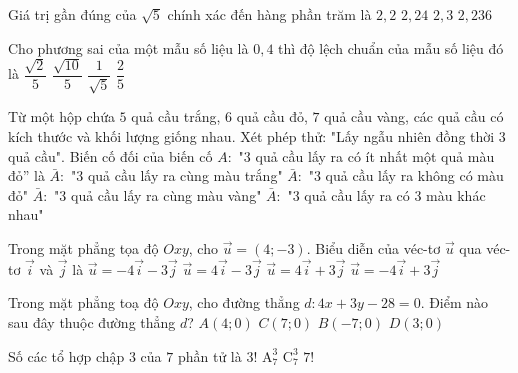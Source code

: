 \begin{ex}%
	Giá trị gần đúng của $\sqrt{5}$ chính xác đến hàng phần trăm là
	\choice
	{$2{,}2$ }
	{\True $2{,}24$}
	{$2{,}3$}
	{$2{,}236$}
\end{ex}
\begin{ex}%
	Cho phương sai của một mẫu số liệu là $0{,}4$ thì độ lệch chuẩn của mẫu số liệu đó là
	\choice
	{$\dfrac{\sqrt{2}}{5}$}
	{\True $\dfrac{\sqrt{10}}{5}$}
	{$\dfrac{1}{\sqrt{5}}$}
	{$\dfrac{2}{5}$}
\end{ex}
\begin{ex}%
	Từ một hộp chứa $5$ quả cầu trắng, $6$ quả cầu đỏ, $7$ quả cầu vàng, các quả cầu có kích thước và khối lượng giống nhau. Xét phép thử: "Lấy ngẫu nhiên đồng thời $3$ quả cầu". Biến cố đối của biến cố $A\colon$ "$3$ quả cầu lấy ra có ít nhất một quả màu đỏ” là
	\choice
	{$\bar{A}\colon$ "3 quả cầu lấy ra cùng màu trắng"}
	{\True $\bar{A}\colon$ "3 quả cầu lấy ra không có màu đỏ"}
	{$\bar{A}\colon$ "3 quả cầu lấy ra cùng màu vàng"}
	{$\bar{A}\colon$ "3 quả cầu lấy ra có 3 màu khác nhau"}
\end{ex}
\begin{ex}%
	Trong mặt phẳng tọa độ $Oxy$, cho $\vec{u}=(4;-3)$. Biểu diễn của véc-tơ $\vec{u}$ qua véc-tơ $\vec{i}$ và $\vec{j}$ là
	\choice
	{$\vec{u}=-4 \vec{i}-3 \vec{j}$}
	{\True $\vec{u}=4 \vec{i}-3 \vec{j}$}
	{$\vec{u}=4 \vec{i}+3 \vec{j}$}
	{$\vec{u}=-4 \vec{i}+3 \vec{j}$}
\end{ex}
\begin{ex}%
	Trong mặt phẳng toạ độ $Oxy$, cho đường thẳng $d\colon 4x+3y-28=0$. Điểm nào sau đây thuộc đường thẳng $d$?
	\choice
	{$A(4; 0)$}
	{\True $C(7; 0)$}
	{$B(-7; 0)$}
	{$D(3; 0)$}
\end{ex}
\begin{ex}%
	Số các tổ hợp chập $3$ của $7$ phần tử là
	\choice
	{\True $3!$}
	{$\mathrm{A}_{7}^3$}
	{$\mathrm{C}_{7}^3$}
	{$7!$}
\end{ex}
